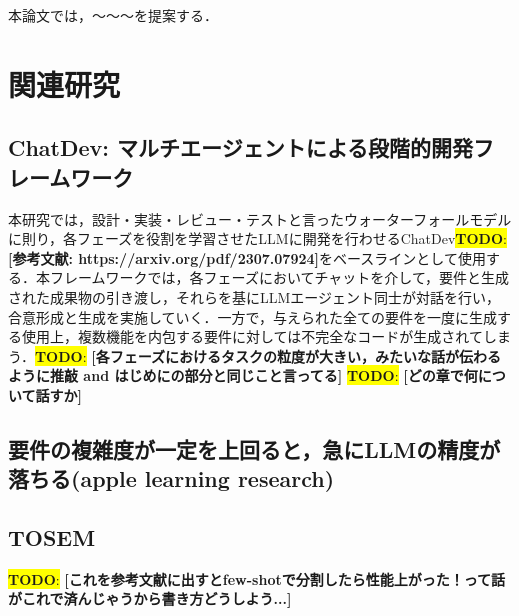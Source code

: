 \documentclass[submit,techrep,noauthor]{ipsj}
\newcommand{\todo}[1]{\colorbox{yellow}{{\bf TODO}:}{\color{red} {\textbf{[#1]}}}}
\begin{document}
本論文では，〜〜〜を提案する．

\section{関連研究}
\label{sec:format}

\subsection{ChatDev: マルチエージェントによる段階的開発フレームワーク}
本研究では，設計・実装・レビュー・テストと言ったウォーターフォールモデルに則り，各フェーズを役割を学習させたLLMに開発を行わせるChatDev\todo{参考文献: https://arxiv.org/pdf/2307.07924}をベースラインとして使用する．本フレームワークでは，各フェーズにおいてチャットを介して，要件と生成された成果物の引き渡し，それらを基にLLMエージェント同士が対話を行い，合意形成と生成を実施していく．一方で，与えられた全ての要件を一度に生成する使用上，複数機能を内包する要件に対しては不完全なコードが生成されてしまう．\todo{各フェーズにおけるタスクの粒度が大きい，みたいな話が伝わるように推敲 and はじめにの部分と同じこと言ってる}
\todo{どの章で何について話すか}

\subsection{要件の複雑度が一定を上回ると，急にLLMの精度が落ちる(apple learning research)}


\subsection{TOSEM}
\todo{これを参考文献に出すとfew-shotで分割したら性能上がった！って話がこれで済んじゃうから書き方どうしよう...}


\end{document}
